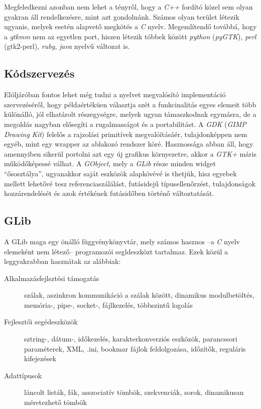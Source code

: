 \documentclass[a4paper,10pt]{article}
\begin{document}
Megfeledkezni azonban nem lehet a tényről, hogy a \textit{C++} fordító közel sem olyan gyakran áll rendelkezésre, mint azt gondolnánk. Számos olyan terület létezik ugyanis, melyek esetén alapvető megkötés a \textit{C} nyelv. Megemlítendő továbbá, hogy a \textit{gtkmm} nem az egyetlen port, hiszen létezik többek között \textit{python} (\textit{pyGTK}), \textit{perl} (gtk2-perl), \textit{ruby}, \textit{java} nyelvű változat is.

\subsection{Kódszervezés}
Elöljáróban fontos lehet még tudni a nyelvet megvalósító implementáció szervezéséről, hogy példaértéküen választja szét a funkcinalitás egyes elemeit több különálló, jól elhatárolt részegységre, melyek ugyan támaszkodnak egymásra, de a megoldás nagyban elősegíti a rugalmasságot és a portabilitást. A \textit{GDK} (\textit{GIMP Drawing Kit}) felelős a rajzolási primitívek megvalóításáér, tulajdonképpen nem egyéb, mint egy wrapper az ablakozó rendszer köré. Hasznossága abban áll, hogy amennyiben sikerül portolni azt egy új grafikus környezetre, akkor a \textit{GTK+} máris működőképessé válhat. A \textit{GObject}, mely a \textit{GLib} része minden widget ``ősosztálya'', ugyanakkor saját eszközök alapkövévé is thetjük, hisz egyebek mellett lehetővé tesz referenciaszálálást, futásidejű típusellenőrzést, tulajdonságok hozzárendelését és azok értékének futásidőben történő változtatását.

\subsection{GLib}
A GLib maga egy önálló függvénykönyvtár, mely számos hasznos --a \textit{C} nyelv elemeként nem létező-- programozói segldeszközt tartalmaz. Ezek közül a leggyakrabban hasznátak az alábbiak:

\begin{description}
 \item[Alkalmazásfejlsztési támogatás] szálak, aszinkron kommunikáció a szálak között, dinamikus modulbetöltés, memória-, pipe-, socket-, fájlkezelés, többszintű logolás
 \item[Fejlesztői segédeszközök] sztring-, dátum-, időkezelés, karakterkonverziós eszközök, parancssori paraméterek, XML, .ini, bookmar fájlok feldolgozása, időzítők, reguláris kifejezések
 \item[Adattípusok] láncolt listák, fák, asszociatív tömbök, szekvenciák, sorok, dinamikusan méretezhető tömbök
\end{description}
\end{document}
